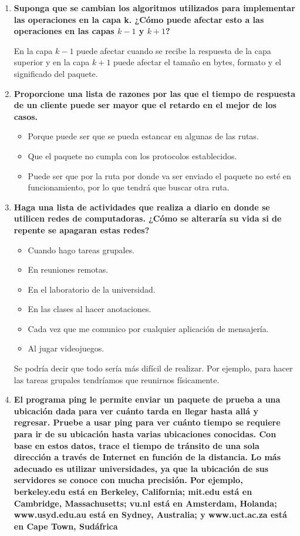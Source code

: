 \documentclass[a4paper,12pt]{article}
\begin{document}
\begin{enumerate}
 \item \textbf{Suponga que se cambian los algoritmos utilizados para implementar las operaciones en la capa k. ¿Cómo puede
afectar esto a las operaciones en las capas $k - 1$ y $k + 1$?}

 En la capa $k-1$ puede afectar cuando se recibe la respuesta de la capa superior y en la capa $k+1$ puede afectar el tamaño en bytes, formato y el significado del paquete.
 
 \item \textbf{Proporcione una lista de razones por las que el tiempo de respuesta de un cliente puede ser mayor que el retardo
en el mejor de los casos.}

\begin{itemize}
 \item Porque puede ser que se pueda estancar en algunas de las rutas.
 \item Que el paquete no cumpla con los protocolos establecidos.
 \item Puede ser que por la ruta por donde va ser enviado el paquete no esté en funcionamiento, por lo que tendrá que buscar otra ruta.
\end{itemize}

 \item \textbf{Haga una lista de actividades que realiza a diario en donde se utilicen redes de computadoras. ¿Cómo se alteraría
su vida si de repente se apagaran estas redes?}

\begin{itemize}
 \item Cuando hago tareas grupales.
 \item En reuniones remotas.
 \item En el laboratorio de la universidad.
 \item En las clases al hacer anotaciones.
 \item Cada vez que me comunico por cualquier aplicación de mensajería.
 \item Al jugar videojuegos.
\end{itemize}

Se podría decir que todo sería más difícil de realizar. Por ejemplo, para hacer las tareas grupales tendríamos que reunirnos físicamente.

 \item \textbf{El programa ping le permite enviar un paquete de prueba a una ubicación dada para ver cuánto tarda en llegar
hasta allá y regresar. Pruebe a usar ping para ver cuánto tiempo se requiere para ir de su ubicación hasta varias
ubicaciones conocidas. Con base en estos datos, trace el tiempo de tránsito de una sola dirección a través de
Internet en función de la distancia. Lo más adecuado es utilizar universidades, ya que la ubicación de sus servidores
se conoce con mucha precisión. Por ejemplo, berkeley.edu está en Berkeley, California; mit.edu está en
Cambridge, Massachusetts; vu.nl está en Amsterdam, Holanda; www.usyd.edu.au está en Sydney, Australia; y
www.uct.ac.za está en Cape Town, Sudáfrica}


\end{enumerate}
\end{document}
